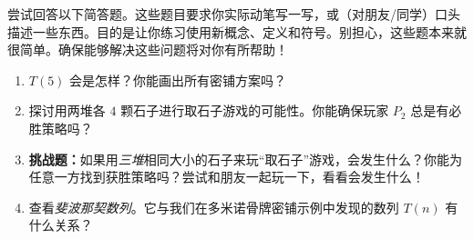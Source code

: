 尝试回答以下简答题。这些题目要求你实际动笔写一写，或（对朋友/同学）口头描述一些东西。目的是让你练习使用新概念、定义和符号。别担心，这些题本来就很简单。确保能够解决这些问题将对你有所帮助！

\begin{enumerate}[label=(\arabic*)]
    \item $T(5)$ 会是怎样？你能画出所有密铺方案吗？
    \item 探讨用两堆各 $4$ 颗石子进行取石子游戏的可能性。你能确保玩家 $P_2$ 总是有必胜策略吗？
    \item \textbf{挑战题：}如果用\emph{三堆}相同大小的石子来玩``取石子''游戏，会发生什么？你能为任意一方找到获胜策略吗？尝试和朋友一起玩一下，看看会发生什么！
    \item 查看\emph{斐波那契数列}。它与我们在多米诺骨牌密铺示例中发现的数列 $T(n)$ 有什么关系？
\end{enumerate}